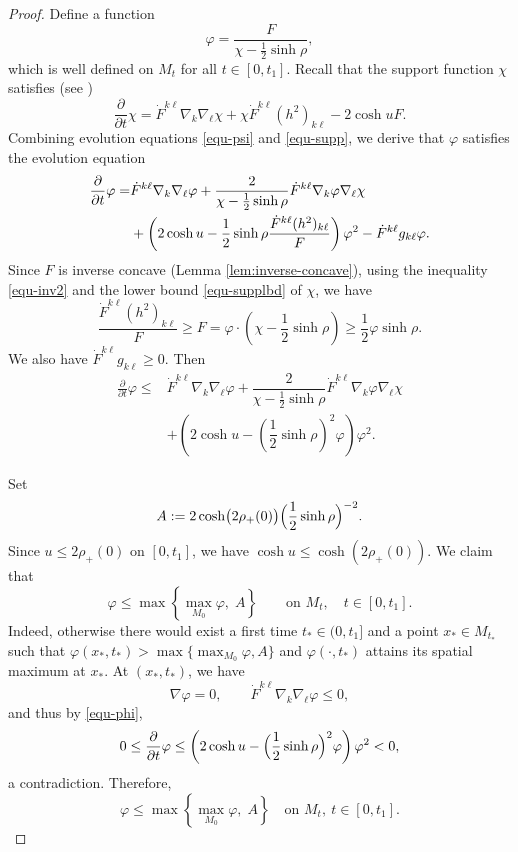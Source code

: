 \documentclass[11pt,reqno]{amsart}
\theoremstyle{remark}
\numberwithin{equation}{section}
\begin{document}
\begin{proof}
	Define a function
	\begin{equation*}
		\varphi = \dfrac{F}{\chi-\frac{1}{2}\sinh\rho},
	\end{equation*}
    which is well defined on $M_t$ for all $t\in[0,t_1]$. Recall that the support function $\chi$ satisfies (see \cite[Section 4]{AW18})
    \begin{equation}
    	\dfrac{\partial}{\partial t}\chi = \dot{F}^{k\ell}\nabla_k\nabla_{\ell}\chi + \chi\dot{F}^{k\ell}(h^2)_{k\ell}- 2\cosh u F.\label{equ-supp}
    \end{equation}
    Combining evolution equations \eqref{equ-psi} and \eqref{equ-supp}, we derive that $\varphi$ satisfies the evolution equation
    \begin{align*}
    	\dfrac{\partial}{\partial t}\varphi =& \dot{F}^{k\ell}\nabla_k\nabla_{\ell}\varphi + \dfrac{2}{\chi-\frac{1}{2}\sinh\rho}\dot{F}^{k\ell}\nabla_k\varphi\nabla_{\ell}\chi \notag\\
    	& + \left( 2\cosh u - \dfrac{1}{2}\sinh\rho\dfrac{\dot{F}^{k\ell}(h^2)_{k\ell}}{F} \right)\varphi^2 - \dot{F}^{k\ell}g_{k\ell}\varphi.
    \end{align*}
    Since $F$ is inverse concave (Lemma \ref{lem:inverse-concave}), using the inequality \eqref{equ-inv2} and the lower bound \eqref{equ-supplbd} of $\chi$, we have 
    \begin{equation*}
    	\dfrac{\dot{F}^{k\ell}(h^2)_{k\ell}}{F} \geq F = \varphi \cdot \left( \chi - \dfrac{1}{2}\sinh\rho \right) \geq \dfrac{1}{2}\varphi\sinh\rho.
    \end{equation*}
  We also have $\dot{F}^{k\ell}g_{k\ell}\geq 0$. Then 
    \begin{align}
    	\frac{\partial}{\partial t}\varphi 
    	\leq & \dot{F}^{k\ell}\nabla_k\nabla_{\ell}\varphi + \dfrac{2}{\chi-\frac{1}{2}\sinh\rho}\dot{F}^{k\ell}\nabla_k\varphi\nabla_{\ell}\chi \nonumber\\
    	& + \left( 2\cosh u - \left(\dfrac{1}{2}\sinh\rho \right)^2\varphi \right)\varphi^2.
    	\label{equ-phi}
    \end{align}
    
Set
\[
A:=2\cosh\bigl(2\rho_+(0)\bigr)\Bigl(\frac12\sinh\rho\Bigr)^{-2}.
\]
Since $u\le 2\rho_+(0)$ on $[0,t_1]$, we have $\cosh u\le \cosh(2\rho_+(0))$. We claim that
\[
\varphi\le \max\left\{\max_{M_0}\varphi,\;A\right\}
\qquad\text{on } M_t,\quad t\in[0,t_1].
\]
Indeed, otherwise there would exist a first time $t_*\in(0,t_1]$ and a point $x_*\in M_{t_*}$ such that $\varphi(x_*,t_*)>\max\{\max_{M_0}\varphi,A\}$ and $\varphi(\cdot,t_*)$ attains its spatial maximum at $x_*$. At $(x_*,t_*)$, we have
\[
\nabla\varphi=0,
\qquad
\dot F^{k\ell}\nabla_k\nabla_\ell\varphi\le 0,
\]
and thus by \eqref{equ-phi},
\[
0\le \frac{\partial}{\partial t}\varphi
\le \left(2\cosh u-\Bigl(\frac12\sinh\rho\Bigr)^2\varphi\right)\varphi^2
<0,
\]
a contradiction. Therefore,
\[
\varphi\le \max\left\{\max_{M_0}\varphi,\;A\right\}
\quad\text{on } M_t,\ t\in[0,t_1].
\]


\end{proof}
\end{document}
